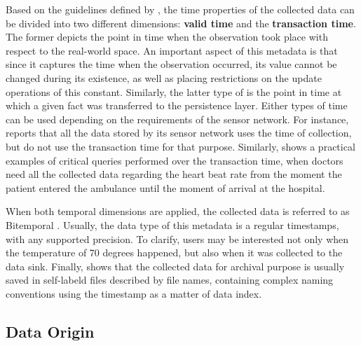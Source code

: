 Based on the guidelines defined by \cite{db-temporal}, the time properties of
the collected data can be divided into two different dimensions: \textbf{valid
time} and the \textbf{transaction time}. The former depicts the point in time
when the observation took place with respect to the real-world space. An
important aspect of this metadata is that since it captures the time when the
observation occurred, its value cannot be changed during its existence, as well
as placing restrictions on the update operations of this constant. Similarly,
the latter type of is the point in time at which a given fact was transferred
to the persistence layer. Either types of time can be used depending on the
requirements of the sensor network. For instance, \cite{sn-dataware-house}
reports that all the data stored by its sensor network uses the time of
collection, but do not use the transaction time for that purpose. Similarly,
\cite{sn-provenance} shows a practical examples of critical queries performed
over the transaction time, when doctors need all the collected data regarding
the heart beat rate from the moment the patient entered the ambulance until
the moment of arrival at the hospital.

When both temporal dimensions are applied, the collected data is referred to as
Bitemporal \cite{db-temporal}. Usually, the data type of this metadata is a
regular timestamps, with any supported precision. To clarify, users may be
interested not only when the temperature of 70 degrees happened, but also when
it was collected to the data sink. Finally, \cite{sn-provenance} shows that
the collected data for archival purpose is usually saved in self-labeld
files described by file names, containing complex naming conventions using the 
timestamp as a matter of data index.

\subsection{Data Origin}

